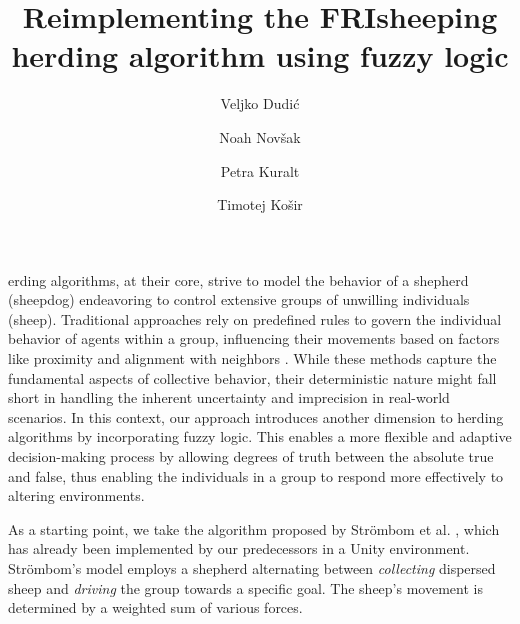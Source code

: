 \documentclass[9pt]{pnas-new}
\title{Reimplementing the FRIsheeping herding algorithm using fuzzy logic}
\author{Veljko Dudić}
\author{Noah Novšak}
\author{Petra Kuralt}
\author{Timotej Košir}
\affil{Collective behavior course research seminar report}
\begin{document}
\verticaladjustment{-2pt}

\maketitle
\thispagestyle{firststyle}

erding algorithms, at their core, strive to model the behavior of a shepherd (sheepdog) endeavoring to control extensive groups of unwilling individuals (sheep).
Traditional approaches rely on predefined rules to govern the individual behavior of agents within a group, influencing their movements based on factors like proximity and alignment with neighbors \cite{basicHerding}. While these methods capture the fundamental aspects of collective behavior, their deterministic nature might fall short in handling the inherent uncertainty and imprecision in real-world scenarios. In this context, our approach introduces another dimension to herding algorithms by incorporating fuzzy logic. This enables a more flexible and adaptive decision-making process by allowing degrees of truth between the absolute true and false, thus enabling the individuals in a group to respond more effectively to altering environments.

As a starting point, we take the algorithm proposed by Str\"{o}mbom et al. \cite{strombom}, which has already been implemented by our predecessors in a Unity environment. Str\"{o}mbom's model employs a shepherd alternating between \textit{collecting} dispersed sheep and \textit{driving} the group towards a specific goal. The sheep's movement is determined by a weighted sum of various forces. 
\end{document}
